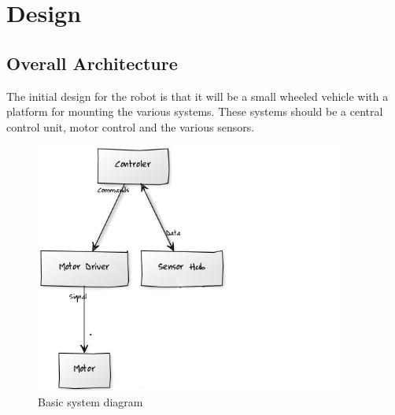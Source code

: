 \chapter{Design}








\section{Overall Architecture}
The initial design for the robot is that it will be a small wheeled vehicle with a platform for mounting the various systems.  These systems should be a central control unit, motor control and the various sensors.

\begin{figure}[h]
\centering
        \includegraphics[width=4.0in] {Images/basic-uml.png}
        \caption{Basic system diagram}
        \label{Basic system diagram}
\end{figure}



